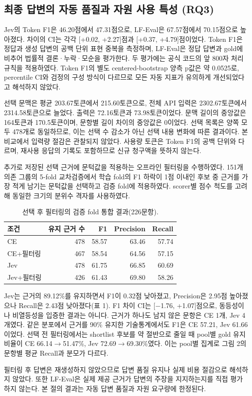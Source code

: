 \subsection{최종 답변의 자동 품질과 자원 사용 특성 (RQ3)}

\label{sec:ch4_4}

Jev의 Token F1은 46.20점에서 47.31점으로, LF-Eval은 67.57점에서 70.15점으로 높아졌다. 차이의 CI는 각각 [+0.02, +2.27]점과 [+0.37, +4.79]점이었다. Token F1은 정답과 생성 답변의 공백 단위 표현 중복을 측정하며, LF-Eval은 정답 답변과 gold에 비추어 법률적 결론·누락·모순을 평가한다. 두 평가에는 공식 코드의 앞 800자 처리 규칙을 적용하였다. Token F1의 별도 centered-bootstrap 양측 p값은 약 0.0525로, percentile CI와 검정의 구성 방식이 다르므로 모든 자동 지표가 유의하게 개선되었다고 해석하지 않았다.

선택 문맥은 평균 203.67토큰에서 215.60토큰으로, 전체 API 입력은 2302.67토큰에서 2314.58토큰으로 늘었다. 출력은 72.16토큰과 73.98토큰이었다. 문맥 길이의 중앙값은 164토큰과 170.5토큰이며, 문항별 길이 차이의 중앙값은 0이었다. 선택 목록은 양쪽 모두 478개로 동일하므로, 이는 선택 수 감소가 아닌 선택 내용 변화에 따른 결과이다. 본 비교에서 입력량 절감은 관찰되지 않았다. 사용량 토큰은 Token F1의 공백 단위와 다르며, 재사용 응답의 기록도 포함하므로 신규 청구액을 뜻하지 않는다.

추가로 저장된 선택 근거에 문턱값을 적용하는 오프라인 필터링을 수행하였다. 151개 의존 그룹의 5-fold 교차검증에서 학습 fold의 F1 하락이 1점 이내인 후보 중 근거를 가장 적게 남기는 문턱값을 선택하고 검증 fold에 적용하였다. scorer별 점수 척도를 고려해 동일한 크기의 분위수 격자를 사용하였다.

\begin{table}[htbp]
\centering
\caption{선택 후 필터링의 검증 fold 통합 결과(226문항).}
\small
\setlength{\tabcolsep}{3pt}
\begin{tabular}{@{}lrrrr@{}}
\hline
조건 & 유지 근거 수 & F1 & Precision & Recall \\
\hline
CE & 478 & 58.57 & 63.46 & 57.74 \\
CE+필터링 & 467 & 58.54 & 64.56 & 57.15 \\
Jev & 478 & 61.75 & 66.85 & 60.69 \\
Jev+필터링 & 426 & 61.43 & 69.80 & 58.26 \\
\hline
\end{tabular}
\end{table}

Jev는 근거의 89.12\%를 유지하면서 F1이 0.32점 낮아졌고, Precision은 2.95점 높아졌으나 Recall은 2.43점 낮아졌다(표 1). F1 차이 CI는 [$-$1.76, +1.07]점으로, 동등성이나 비열등성을 입증한 결과는 아니다. 근거가 하나도 남지 않은 문항은 CE 1개, Jev 4개였다. 같은 분포에서 근거를 90\% 유지한 기술통계에서도 F1은 CE 57.21, Jev 61.66이었다. 선택 전 필터링에서는 shortlist 후보를 약 절반으로 줄일 때 pool별 gold 유지 비율이 CE 66.14$\to$51.47\%, Jev 72.69$\to$69.30\%였다. 이는 pool별 집계로 그림 2의 문항별 평균 Recall과 분모가 다르다.

필터링 후 답변은 재생성하지 않았으므로 답변 품질 유지나 실제 비용 절감으로 해석하지 않았다. 또한 LF-Eval은 실제 제공 근거가 답변의 주장을 지지하는지를 직접 평가하지 않는다. 본 절의 결과는 자동 답변 품질과 자원 요구량에 한정된다.
